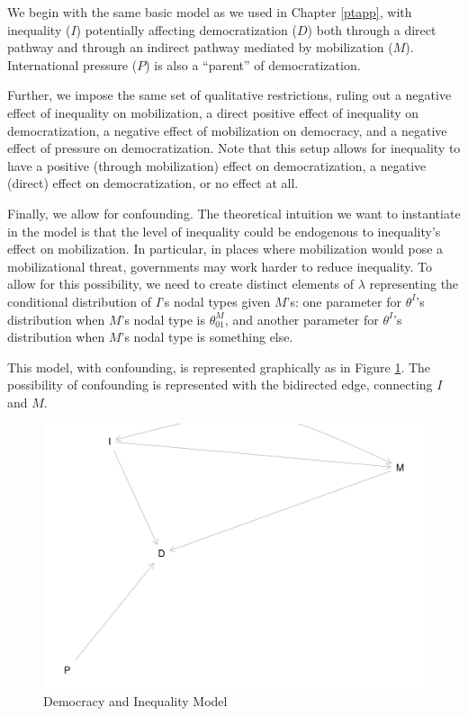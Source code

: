 \documentclass[
  12pt,
]{book}
\begin{document}
We begin with the same basic model as we used in Chapter \ref{ptapp}, with inequality (\(I\)) potentially affecting democratization (\(D\)) both through a direct pathway and through an indirect pathway mediated by mobilization (\(M\)). International pressure (\(P\)) is also a ``parent'' of democratization.

Further, we impose the same set of qualitative restrictions, ruling out a negative effect of inequality on mobilization, a direct positive effect of inequality on democratization, a negative effect of mobilization on democracy, and a negative effect of pressure on democratization. Note that this setup allows for inequality to have a positive (through mobilization) effect on democratization, a negative (direct) effect on democratization, or no effect at all.

Finally, we allow for confounding. The theoretical intuition we want to instantiate in the model is that the level of inequality could be endogenous to inequality's effect on mobilization. In particular, in places where mobilization would pose a mobilizational threat, governments may work harder to reduce inequality. To allow for this possibility, we need to create distinct elements of \(\lambda\) representing the conditional distribution of \(I\)'s nodal types given \(M\)'s: one parameter for \(\theta^I\)'s distribution when \(M\)'s nodal type is \(\theta^M_{01}\), and another parameter for \(\theta^I\)'s distribution when \(M\)'s nodal type is something else.

This model, with confounding, is represented graphically as in Figure \ref{fig:pimdgraph}. The possibility of confounding is represented with the bidirected edge, connecting \(I\) and \(M\).

\begin{figure}
\centering
\includegraphics{ii_files/figure-latex/pimdgraph-1.pdf}
\caption{\label{fig:pimdgraph}Democracy and Inequality Model}
\end{figure}
\end{document}
